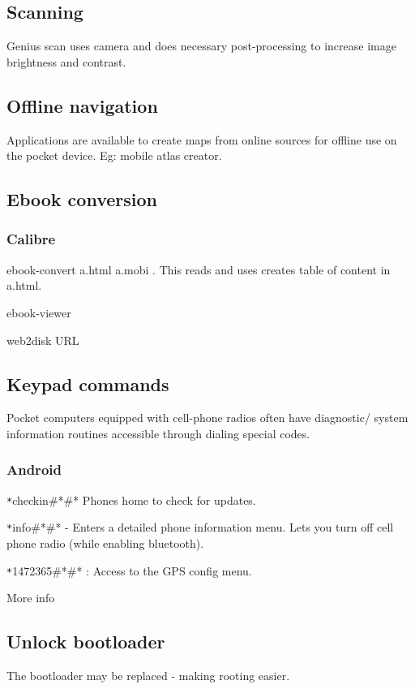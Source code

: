 \documentclass[oneside, article]{memoir}
\begin{document}
\subsection{Scanning}
Genius scan uses camera and does necessary post-processing to increase image brightness and contrast.

\subsection{Offline navigation}
Applications are available to create maps from online sources for offline use on the pocket device. Eg: mobile atlas creator.



\subsection{Ebook conversion}
\subsubsection{Calibre}
ebook-convert a.html a.mobi . This reads and uses creates table of content in a.html.

ebook-viewer

web2disk URL

\subsection{Keypad commands}
Pocket computers equipped with cell-phone radios often have diagnostic/ system information routines accessible through dialing special codes.

\subsubsection{Android}
\verb *#*#checkin#*#* Phones home to check for updates.

\verb *#*#info#*#* - Enters a detailed phone information menu. Lets you turn off cell phone radio (while enabling bluetooth).

\verb *#*#1472365#*#* : Access to the GPS config menu.

More info 

\subsection{Unlock bootloader}
The bootloader may be replaced - making rooting easier.
\end{document}
